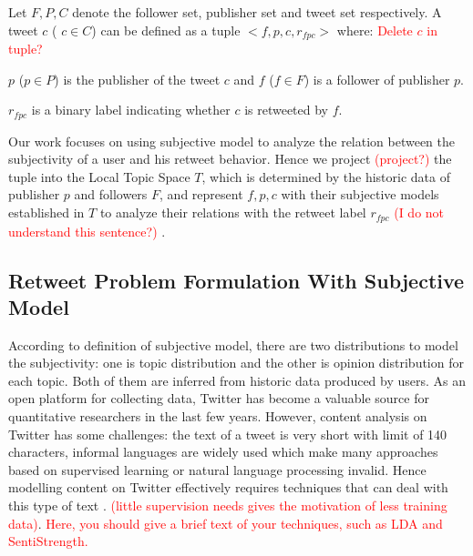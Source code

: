 \documentclass{acm_proc_article-sp}
\newcommand{\mo}[1]{\textcolor{red}{#1}}
\begin{document}
Let $ F, P, C $ denote the follower set, publisher set and tweet set respectively. 
A tweet $c$ ( $ c \in C $) can be defined as a tuple $ <f, p, c, r_{fpc}>  $ where: \mo{Delete $c$ in tuple?} 
\begin{itemize*}
\item  $p$ ($p \in P $) is the publisher of the tweet $c$ and $f$ ($ f \in F $) is a follower of publisher $p$.
\item $ r_{fpc} $ is a binary label indicating whether $ c $ is retweeted by $ f $.
\end{itemize*}

Our work focuses on using subjective model to analyze the relation between the subjectivity of a user and his retweet behavior. 
Hence we project \mo{(project?)} the tuple into the Local Topic Space $ T $, which is determined by the historic data of publisher $ p $ and followers $F $, and represent $ f, p, c $ with their subjective models established in $ T $ to analyze their relations with the retweet label $ r_{fpc} $ \mo{(I do not understand this sentence?)} .

\subsection{Retweet Problem Formulation With Subjective Model}
\label{concrete}
According to definition of subjective model, there are two distributions to model the subjectivity: one is topic distribution and the other is opinion distribution for each topic. Both of them are inferred from historic data produced by users.
As an open platform for collecting data, Twitter has become a valuable source for quantitative researchers in the last few years.
However, content analysis on Twitter has some challenges: the text of a tweet is very short with limit of 140 characters, informal languages are widely used which make many approaches based on supervised learning or natural language processing invalid. 
Hence modelling content on Twitter effectively requires techniques that can deal with this type of text .  \mo{ (little supervision needs gives the motivation of less training data)}.  \mo{Here, you should give a brief text of your techniques, such as LDA and SentiStrength.}
\end{document}
